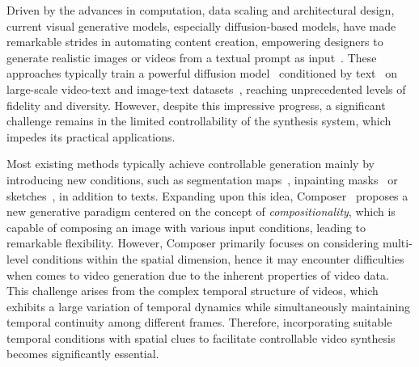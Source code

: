 Driven by the advances in computation, data scaling and architectural design, current visual generative models, especially diffusion-based models, have made remarkable strides in automating content creation, empowering designers to generate realistic images or videos from a textual prompt as input~\cite{rombach2022LDM, singer2022make-a-video,ho2022imagenvideo}.
These approaches typically train a powerful diffusion model~\cite{rombach2022LDM} conditioned by text~\cite{ho2020denoising_ddpm} on large-scale video-text and image-text datasets~\cite{2021Frozen,schuhmann2021laion}, reaching unprecedented levels of fidelity and diversity.
However, despite this impressive progress, a significant challenge remains in the limited controllability of the synthesis system, which impedes its practical applications.

Most existing methods typically achieve controllable generation mainly by introducing new conditions, such as segmentation maps~\cite{rombach2022LDM, wang2022pretraining}, inpainting masks~\cite{xie2022smartbrush} or sketches~\cite{zhang2023controlnet, mou2023T2I_Adapter}, in addition to texts.
Expanding upon this idea, Composer~\cite{huang2023composer} proposes a new generative paradigm centered on the concept of \emph{compositionality}, which is capable of composing an image with various input conditions, leading to remarkable flexibility.
However, Composer primarily focuses on considering multi-level conditions within the spatial dimension, hence it may encounter difficulties when comes to video generation due to the inherent properties of video data.
This challenge arises from the complex temporal structure of videos, which exhibits a large variation of temporal dynamics while simultaneously maintaining temporal continuity among different frames.
Therefore, incorporating suitable temporal conditions with spatial clues to facilitate controllable video synthesis becomes significantly essential.

